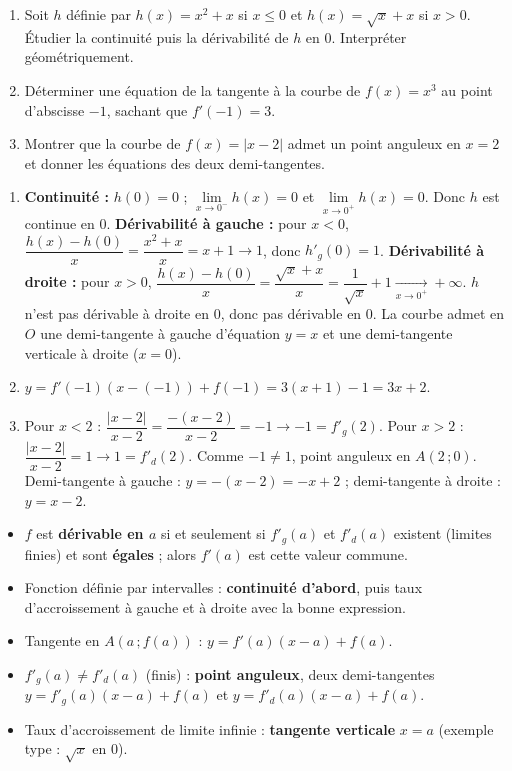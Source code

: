 \documentclass[11pt]{article}
\begin{document}
\begin{exercice}
\begin{enumerate}
\item Soit $h$ définie par $h(x) = x^{2} + x$ si $x \leq 0$ et $h(x) = \sqrt{x} + x$ si $x > 0$. Étudier la continuité puis la dérivabilité de $h$ en $0$. Interpréter géométriquement.
\item Déterminer une équation de la tangente à la courbe de $f(x) = x^{3}$ au point d'abscisse $-1$, sachant que $f'(-1) = 3$.
\item Montrer que la courbe de $f(x) = |x-2|$ admet un point anguleux en $x = 2$ et donner les équations des deux demi-tangentes.
\end{enumerate}
\end{exercice}

\begin{corrige}[Exercice]
\begin{enumerate}
\item \textbf{Continuité :} $h(0) = 0$ ; $\lim\limits_{x \to 0^{-}} h(x) = 0$ et $\lim\limits_{x \to 0^{+}} h(x) = 0$. Donc $h$ est continue en $0$.
\textbf{Dérivabilité à gauche :} pour $x < 0$, $\dfrac{h(x)-h(0)}{x} = \dfrac{x^{2}+x}{x} = x+1 \to 1$, donc $h'_{g}(0) = 1$.
\textbf{Dérivabilité à droite :} pour $x > 0$, $\dfrac{h(x)-h(0)}{x} = \dfrac{\sqrt{x}+x}{x} = \dfrac{1}{\sqrt{x}} + 1 \xrightarrow[x \to 0^{+}]{} +\infty$.
$h$ n'est pas dérivable à droite en $0$, donc pas dérivable en $0$. La courbe admet en $O$ une demi-tangente à gauche d'équation $y = x$ et une demi-tangente verticale à droite ($x = 0$).
\item $y = f'(-1)(x-(-1)) + f(-1) = 3(x+1) - 1 = 3x + 2$.
\item Pour $x < 2$ : $\dfrac{|x-2|}{x-2} = \dfrac{-(x-2)}{x-2} = -1 \to -1 = f'_{g}(2)$. Pour $x > 2$ : $\dfrac{|x-2|}{x-2} = 1 \to 1 = f'_{d}(2)$. Comme $-1 \neq 1$, point anguleux en $A(2\,;0)$. Demi-tangente à gauche : $y = -(x-2) = -x+2$ ; demi-tangente à droite : $y = x - 2$.
\end{enumerate}
\end{corrige}

\begin{aretenir}
\begin{itemize}
\item $f$ est \textbf{dérivable en $a$} si et seulement si $f'_{g}(a)$ et $f'_{d}(a)$ existent (limites finies) et sont \textbf{égales} ; alors $f'(a)$ est cette valeur commune.
\item Fonction définie par intervalles : \textbf{continuité d'abord}, puis taux d'accroissement à gauche et à droite avec la bonne expression.
\item Tangente en $A(a\,;f(a))$ : $y = f'(a)(x-a) + f(a)$.
\item $f'_{g}(a) \neq f'_{d}(a)$ (finis) : \textbf{point anguleux}, deux demi-tangentes $y = f'_{g}(a)(x-a)+f(a)$ et $y = f'_{d}(a)(x-a)+f(a)$.
\item Taux d'accroissement de limite infinie : \textbf{tangente verticale} $x = a$ (exemple type : $\sqrt{x}$ en $0$).
\end{itemize}
\end{aretenir}
\end{document}
